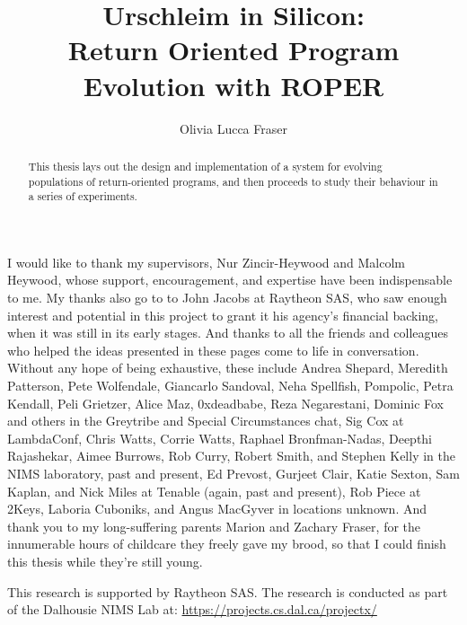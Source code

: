 \title{Urschleim in Silicon:\\Return Oriented Program\\Evolution with ROPER}
\author{Olivia Lucca Fraser}

\mcs
{}

\frontmatter

\begin{abstract}
  This thesis lays out the design and implementation of a system for
  evolving populations of return-oriented programs, and then proceeds to study their
  behaviour in a series of experiments. 
\end{abstract}

\begin{acknowledgements}
I would like to thank my supervisors, Nur Zincir-Heywood and Malcolm Heywood,
whose support, encouragement, and expertise have been indispensable to me. My
thanks also go to to John Jacobs at Raytheon SAS, who saw enough interest and
potential in this project to grant it his agency's financial backing, when it
was still in its early stages. And thanks to all the friends and colleagues who
helped the ideas presented in these pages come to life in conversation. Without
any hope of being exhaustive, these include Andrea Shepard, Meredith Patterson,
Pete Wolfendale, Giancarlo Sandoval, Neha Spellfish, Pompolic, Petra Kendall,
Peli Grietzer, Alice Maz, 0xdeadbabe, Reza Negarestani, Dominic Fox and others
in the Greytribe and Special Circumstances chat, Sig Cox at LambdaConf, Chris
Watts, Corrie Watts, Raphael Bronfman-Nadas, Deepthi Rajashekar, Aimee Burrows,
Rob Curry, Robert Smith, and Stephen Kelly in the NIMS laboratory, past and
present, Ed Prevost, Gurjeet Clair, Katie Sexton, Sam Kaplan, and Nick Miles at Tenable
(again, past and present), Rob Piece at 2Keys, Laboria Cuboniks, and Angus
MacGyver in locations unknown. And thank
you to my long-suffering parents Marion and Zachary Fraser, for the innumerable
hours of childcare they freely gave my brood, so that I could finish this thesis
while they're still young.

This research is supported by Raytheon SAS. The research is conducted
as part of the Dalhousie NIMS Lab at: \url{https://projects.cs.dal.ca/projectx/}
\end{acknowledgements}

\printnoidxglossaries
\clearpage
{}
\mainmatter